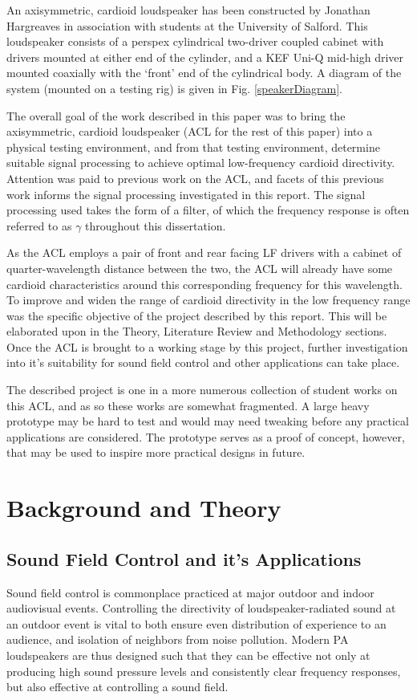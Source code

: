 \documentclass{report}
\begin{document}
    An axisymmetric, cardioid loudspeaker has been constructed by Jonathan Hargreaves in association with students at the University of Salford.
    This loudspeaker consists of a perspex cylindrical two-driver coupled cabinet with drivers mounted at either end of the cylinder, and a KEF Uni-Q mid-high driver mounted coaxially with the `front' end of the cylindrical body.
    A diagram of the system (mounted on a testing rig) is given in Fig. \ref{speakerDiagram}.
   
    The overall goal of the work described in this paper was to bring the axisymmetric, cardioid loudspeaker (ACL for the rest of this paper) into a physical testing environment, and from that testing environment, determine suitable signal processing to achieve optimal low-frequency cardioid directivity.
    Attention was paid to previous work on the ACL, and facets of this previous work informs the signal processing investigated in this report.
    The signal processing used takes the form of a filter, of which the frequency response is often referred to as $\gamma$ throughout this dissertation.

    As the ACL employs a pair of front and rear facing LF drivers with a cabinet of quarter-wavelength distance between the two, the ACL will already have some cardioid characteristics around this corresponding frequency for this wavelength.
    To improve and widen the range of cardioid directivity in the low frequency range was the specific objective of the project described by this report. 
    This will be elaborated upon in the Theory, Literature Review and Methodology sections.
    Once the ACL is brought to a working stage by this project, further investigation into it's suitability for sound field control and other applications can take place.

    The described project is one in a more numerous collection of student works on this ACL, and as so these works are somewhat fragmented.
    A large heavy prototype may be hard to test and would may need tweaking before any practical applications are considered.
    The prototype serves as a proof of concept, however, that may be used to inspire more practical designs in future.


\chapter{Background and Theory}
    \section{Sound Field Control and it's Applications}
        Sound field control is commonplace practiced at major outdoor and indoor audiovisual events.
        Controlling the directivity of loudspeaker-radiated sound at an outdoor event is vital to both ensure even distribution of experience to an audience, and isolation of neighbors from noise pollution.
        Modern PA loudspeakers are thus designed such that they can be effective not only at producing high sound pressure levels and consistently clear frequency responses, but also effective at controlling a sound field.
\end{document}
